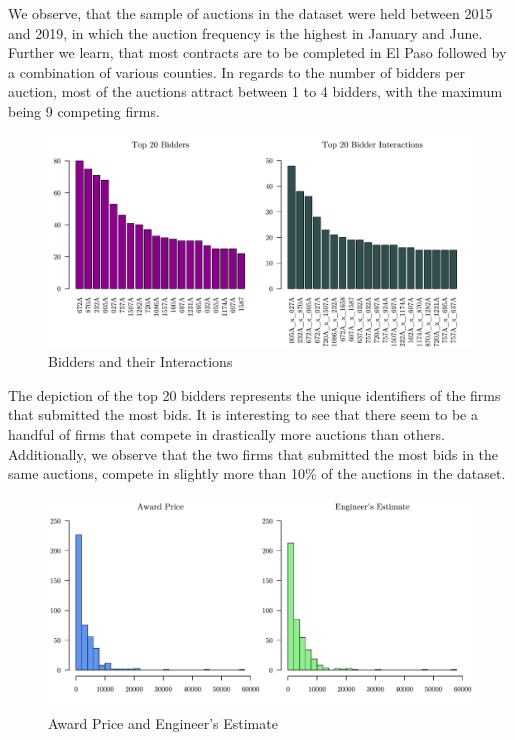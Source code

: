 \documentclass[a4paper,12pt, headsepline]{scrartcl}
\numberwithin{equation}{section}
\begin{document}
We observe, that the sample of auctions in the dataset were held between 2015 and 2019, in which the auction frequency is the highest in January and June. Further we learn, that most contracts are to be completed in El Paso followed by a combination of various counties. In regards to the number of bidders per auction, most of the auctions attract between 1 to 4 bidders, with the maximum being 9 competing firms.

\begin{figure}[H]
	\includegraphics[width = 14	cm]{figures/vend_plots.pdf}
	\caption{Bidders and their Interactions}\label{fig:vendplots}
\end{figure}

The depiction of the top 20 bidders represents the unique identifiers of the firms that submitted the most bids. It is interesting to see that there seem to be a handful of firms that compete in drastically more auctions than others. Additionally, we observe that the two firms that submitted the most bids in the same auctions, compete in slightly more than 10\% of the auctions in the dataset.

\begin{figure}[H]
	\includegraphics[width = 14	cm]{figures/aw_eng_hist.pdf}
	\caption{Award Price and Engineer's Estimate}\label{fig:aweng}
\end{figure}
\end{document}
